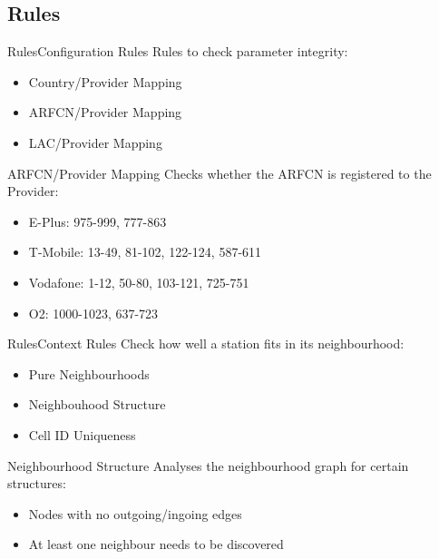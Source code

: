 \documentclass{beamer}
\begin{document}
\subsection{Rules}
\begin{frame}{Rules}{Configuration Rules}
Rules to check parameter integrity:
\begin{itemize}
    \item Country/Provider Mapping
    \item ARFCN/Provider Mapping 
    \item LAC/Provider Mapping
\end{itemize}
\begin{exampleblock}{ARFCN/Provider Mapping}
Checks whether the ARFCN is registered to the Provider:
\begin{itemize}
    \item E-Plus: 975-999, 777-863
    \item T-Mobile: 13-49, 81-102, 122-124, 587-611
    \item Vodafone: 1-12, 50-80, 103-121, 725-751 
    \item O2: 1000-1023, 637-723
\end{itemize}
\end{exampleblock}
\end{frame}

\begin{frame}{Rules}{Context Rules}
Check how well a station fits in its neighbourhood:
\begin{itemize}
    \item Pure Neighbourhoods
    \item Neighbouhood Structure
    \item Cell ID Uniqueness
\end{itemize}
\begin{exampleblock}{Neighbourhood Structure}
Analyses the neighbourhood graph for certain structures:
\begin{itemize}
    \item Nodes with no outgoing/ingoing edges
    \item At least one neighbour needs to be discovered
\end{itemize}
\end{exampleblock}
\end{frame}
\end{document}
